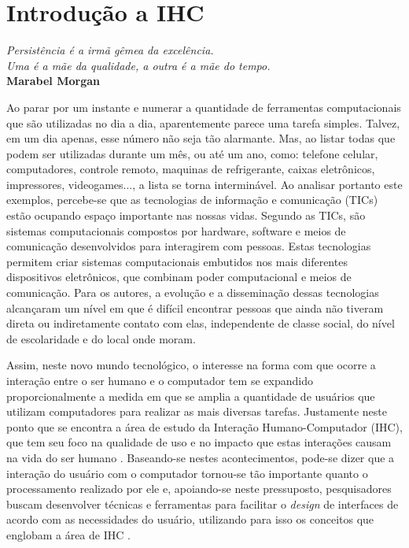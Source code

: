 \chapter{Introdução a IHC}\label{cap:cap1}

\begin{flushright}
	\textit{
		Persistência é a irmã gêmea da excelência. \\
		Uma é a mãe da qualidade, a outra é a mãe do tempo.
	} \\
	
	\textbf{Marabel Morgan}
\end{flushright}

Ao parar por um instante e numerar a quantidade de ferramentas computacionais que são utilizadas no dia a dia, aparentemente parece uma tarefa simples. Talvez, em um dia apenas, esse número não seja tão alarmante. Mas, ao listar todas que podem ser utilizadas durante um mês, ou até um ano, como: telefone celular, computadores, controle remoto, maquinas de refrigerante, caixas eletrônicos, impressores, videogames..., a lista se torna interminável. Ao analisar portanto este exemplos, percebe-se que as tecnologias de informação e comunicação (TICs) estão ocupando espaço importante nas nossas vidas. Segundo  as TICs, são sistemas computacionais compostos por hardware, software e meios de comunicação desenvolvidos para interagirem com pessoas. Estas tecnologias permitem criar sistemas computacionais embutidos nos mais diferentes dispositivos eletrônicos, que combinam poder computacional e meios de comunicação. Para os autores, a evolução e a disseminação dessas tecnologias alcançaram um nível em que é difícil encontrar pessoas que ainda não tiveram direta ou indiretamente contato com elas, independente de classe social, do nível de escolaridade e do local onde moram.

Assim, neste novo mundo tecnológico, o interesse na forma com que ocorre a interação entre o ser humano e o computador tem se expandido proporcionalmente a medida em que se amplia a quantidade de usuários que utilizam computadores para realizar as mais diversas tarefas. Justamente neste ponto que se encontra a área de estudo da Interação Humano-Computador (IHC), que tem seu foco na qualidade de uso e no impacto que estas interações causam na vida do ser humano \cite{barbosa2010IHC}. Baseando-se nestes acontecimentos, pode-se dizer que a interação do usuário com o computador tornou-se tão importante quanto o processamento realizado por ele e, apoiando-se neste pressuposto, pesquisadores buscam desenvolver técnicas e ferramentas para facilitar o \textit{design} de interfaces de acordo com as necessidades do usuário, utilizando para isso os conceitos que englobam a área de IHC \cite{barbosa2010IHC}.

